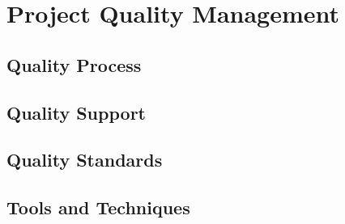 \chapter{Project Quality Management}

\section{Quality Process}

\section{Quality Support}

\section{Quality Standards}

\section{Tools and Techniques}